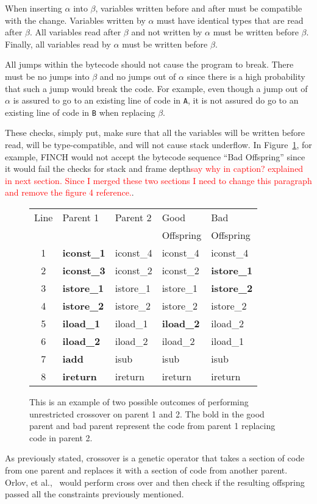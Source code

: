\documentclass{sig-alternate}
\newcommand{\mycomment}[1]{\textcolor{red}{#1}}
\begin{document}
When inserting $\alpha$ into $\beta$, variables written before and after must be compatible with the change. Variables written by $\alpha$ must have identical types that are read after $\beta$. All variables read after $\beta$ and not written by $\alpha$ must be written before $\beta$. Finally, all variables read by $\alpha$ must be written before $\beta$.\par

All jumps within the bytecode should not cause the program to break. There must be no jumps into $\beta$ and no jumps out of $\alpha$ since there is a high probability that such a jump would break the code. For example, even though a jump out of $\alpha$ is assured to go to an existing line of code in \texttt{A}, it is not assured do go to an existing line of code in \texttt{B} when replacing $\beta$.

These checks, simply put, make sure that all the variables will be written before read, will be type-compatible, and will not cause stack underflow\cite{FINCH2:2009}. In Figure~\ref{crossover}, for example, FINCH would not accept the bytecode sequence ``Bad Offspring'' since it would fail the checks for stack and frame depth\mycomment{say why in caption? explained in next section. Since I merged these two sections I need to change this paragraph and remove the figure 4 reference.}.


\begin{figure}
\begin{tabular}{|c|l|l|l|l|}

\hline
Line&Parent 1&Parent 2&Good&Bad\\  
 &         &         &Offspring&Offspring\\ \hline
1&\textbf{iconst\_1}&iconst\_4&iconst\_4&iconst\_4\\
2&\textbf{iconst\_3}&iconst\_2&iconst\_2&\textbf{istore\_1}\\
3&\textbf{istore\_1}&istore\_1&istore\_1&\textbf{istore\_2}\\
4&\textbf{istore\_2}&istore\_2&istore\_2&istore\_2\\
5&\textbf{iload\_1}&iload\_1&\textbf{iload\_2}&iload\_2\\
6&\textbf{iload\_2}&iload\_2&iload\_2&iload\_1\\
7&\textbf{iadd}&isub&isub&isub\\
8&\textbf{ireturn}&ireturn&ireturn&ireturn\\
\hline
\end{tabular}
\caption{This is an example of two possible outcomes of performing unrestricted crossover on parent 1 and 2. The bold in the good parent and bad parent represent the code from parent 1 replacing code in parent 2.}
\label{crossover}
  
\end{figure}
As previously stated, crossover is a genetic operator that takes a section of code from one parent and replaces it with a section of code from another parent. Orlov, et al.,~\cite{FINCH:2011} would perform cross over and then check if the resulting offspring passed all the constraints previously mentioned.\par 
\end{document}
